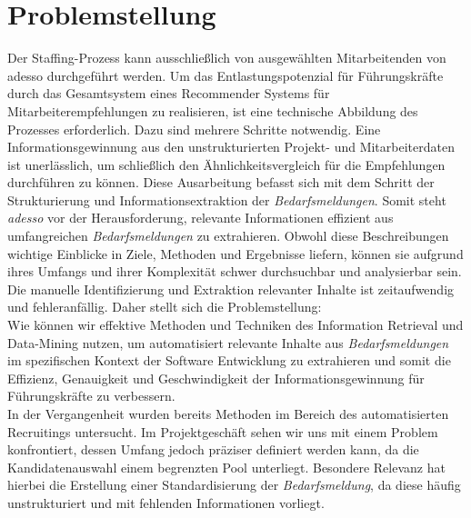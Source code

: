 \section{Problemstellung}
\label{sec:problemstellung}
Der Staffing-Prozess kann ausschließlich von ausgewählten Mitarbeitenden von adesso durchgeführt werden. Um das Entlastungspotenzial für Führungskräfte durch das Gesamtsystem eines Recommender Systems für Mitarbeiterempfehlungen zu realisieren, ist eine technische Abbildung des Prozesses erforderlich. Dazu sind mehrere Schritte notwendig. Eine Informationsgewinnung aus den unstrukturierten Projekt- und Mitarbeiterdaten ist unerlässlich, um schließlich den Ähnlichkeitsvergleich für die Empfehlungen durchführen zu können. Diese Ausarbeitung befasst sich mit dem Schritt der Strukturierung und Informationsextraktion der \emph{Bedarfsmeldungen}. Somit steht \emph{adesso} vor der Herausforderung, relevante Informationen effizient aus umfangreichen \emph{Bedarfsmeldungen} zu extrahieren. Obwohl diese Beschreibungen wichtige Einblicke in Ziele, Methoden und Ergebnisse liefern, können sie aufgrund ihres Umfangs und ihrer Komplexität schwer durchsuchbar und analysierbar sein. Die manuelle Identifizierung und Extraktion relevanter Inhalte ist zeitaufwendig und fehleranfällig. Daher stellt sich die Problemstellung: \\

Wie können wir effektive Methoden und Techniken des Information Retrieval und Data-Mining nutzen, um automatisiert relevante Inhalte aus \emph{Bedarfsmeldungen} im spezifischen Kontext der Software Entwicklung zu extrahieren und somit die Effizienz, Genauigkeit und Geschwindigkeit der Informationsgewinnung für Führungskräfte zu verbessern.\\

In der Vergangenheit wurden bereits Methoden im Bereich des automatisierten Recruitings untersucht. Im Projektgeschäft sehen wir uns mit einem Problem konfrontiert, dessen Umfang jedoch präziser definiert werden kann, da die Kandidatenauswahl einem begrenzten Pool unterliegt. Besondere Relevanz hat hierbei die Erstellung einer Standardisierung der \emph{Bedarfsmeldung}, da diese häufig unstrukturiert und mit fehlenden Informationen vorliegt.
